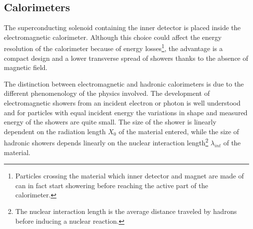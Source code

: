 


\subsection{Calorimeters}
The superconducting solenoid containing the inner detector is placed inside the electromagnetic calorimeter. Although this choice could affect the energy resolution of the calorimeter because of energy losses\footnote{Particles crossing the material which inner detector and magnet are made of can in fact start showering before reaching the active part of the calorimeter.}, the advantage is a compact design and a lower transverse spread of showers thanks to the absence of magnetic field.

The distinction between electromagnetic and hadronic calorimeters is due to the different phenomenology of the physics involved. The development of electromagnetic showers from an incident electron or photon is well understood and for particles with equal incident energy the variations in shape and measured energy of the showers are quite small. The size of the shower is linearly dependent on the radiation length $X_{0}$ of the material entered, while the size of hadronic showers depends linearly on the nuclear interaction length\footnote{The nuclear interaction length is the average distance traveled by hadrons before inducing a nuclear reaction.} $\lambda_{int}$ of the material. 

